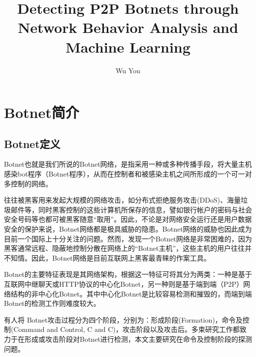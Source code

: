 \documentclass[a4papper]{article}
\title{Detecting P2P Botnets through Network Behavior Analysis and Machine Learning}
\author{
 Wu You\\	
 }
\begin{document}
  	\maketitle
  	\tableofcontents
  	\thispagestyle{empty}%
  \newpage
  	\setcounter{page}{1}%
  	\setcounter{section}{0}%
  	\section{Botnet简介}
  	\subsection{Botnet定义}
  	  	\par\setlength{\parindent}{2em} %
  	Botnet也就是我们所说的Botnet网络，是指采用一种或多种传播手段，将大量主机感染bot程序（Botnet程序），从而在控制者和被感染主机之间所形成的一个可一对多控制的网络。
  	  	\par\setlength{\parindent}{2em} %
  	  	往往被黑客用来发起大规模的网络攻击，如分布式拒绝服务攻击(DDoS)、海量垃圾邮件等，同时黑客控制的这些计算机所保存的信息，譬如银行帐户的密码与社会安全号码等也都可被黑客随意“取用”。因此，不论是对网络安全运行还是用户数据安全的保护来说，Botnet网络都是极具威胁的隐患。Botnet网络的威胁也因此成为目前一个国际上十分关注的问题。然而，发现一个Botnet网络是非常困难的，因为黑客通常远程、隐蔽地控制分散在网络上的“Botnet主机”，这些主机的用户往往并不知情。因此，Botnet网络是目前互联网上黑客最青睐的作案工具。
  	  	\par\setlength{\parindent}{2em} %
  	  	Botnet的主要特征表现是其网络架构，根据这一特征可将其分为两类：一种是基于互联网中继聊天或HTTP协议的中心化Botnet，另一种则是基于端到端（P2P）网络结构的非中心化Botnet。其中中心化Botnet是比较容易检测和摧毁的，而端到端Botnet的检测工作则难度较大。
  	  	\par\setlength{\parindent}{2em} %
  	  	有人将 Botnet攻击过程分为四个阶段，分别为：形成阶段(Formation)，命令及控制(Command and Control, C and C)，攻击阶段以及攻击后\cite{Leonard2009A}。多束研究工作都致力于在形成或攻击阶段对Botnet进行检测，本文主要研究在命令及控制阶段的探测问题。
\end{document}
